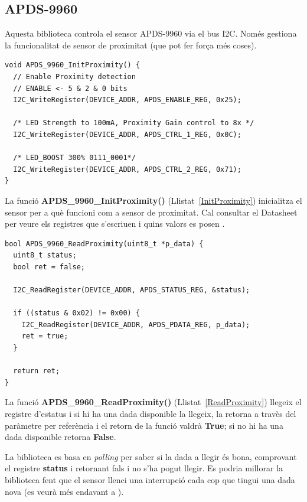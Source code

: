 \subsection{APDS-9960}
Aquesta biblioteca controla el sensor APDS-9960 via el bus \gls{I2C}. Només gestiona la funcionalitat de sensor de proximitat (que pot fer força més coses).

\begin{lstlisting}[caption={Funció {\bf APDS\_9960\_InitProximity()}},style=customc,label=InitProximity]
void APDS_9960_InitProximity() {
  // Enable Proximity detection
  // ENABLE <- 5 & 2 & 0 bits
  I2C_WriteRegister(DEVICE_ADDR, APDS_ENABLE_REG, 0x25);

  /* LED Strength to 100mA, Proximity Gain control to 8x */
  I2C_WriteRegister(DEVICE_ADDR, APDS_CTRL_1_REG, 0x0C);

  /* LED_BOOST 300% 0111_0001*/
  I2C_WriteRegister(DEVICE_ADDR, APDS_CTRL_2_REG, 0x71);
}
\end{lstlisting}

La funció {\bf APDS\_9960\_InitProximity()} (Llistat~\ref{InitProximity}) inicialitza el sensor per a què funcioni com a sensor de proximitat. Cal consultar el Datasheet per veure els registres que s'escriuen i quins valors es posen \cite{apds9960}.

\begin{lstlisting}[caption={Funció {\bf APDS\_9960\_ReadProximity()}},style=customc,label=ReadProximity]
bool APDS_9960_ReadProximity(uint8_t *p_data) {
  uint8_t status;
  bool ret = false;

  I2C_ReadRegister(DEVICE_ADDR, APDS_STATUS_REG, &status);

  if ((status & 0x02) != 0x00) {
    I2C_ReadRegister(DEVICE_ADDR, APDS_PDATA_REG, p_data);
    ret = true;
  }

  return ret;
}
\end{lstlisting}

La funció {\bf APDS\_9960\_ReadProximity()} (Llistat~\ref{ReadProximity}) llegeix el registre d'estatus i si hi ha una dada disponible la llegeix, la retorna a travès del paràmetre per referència i el retorn de la funció valdrà {\bf True}; si no hi ha una dada disponible retorna {\bf False}.

La biblioteca es basa en {\em polling} per saber si la dada a llegir és bona, comprovant el registre {\bf status} i retornant fals i no s'ha pogut llegir. Es podria millorar la biblioteca fent que el sensor llenci una interrupció cada cop que tingui una dada nova (es veurà més endavant a ).

